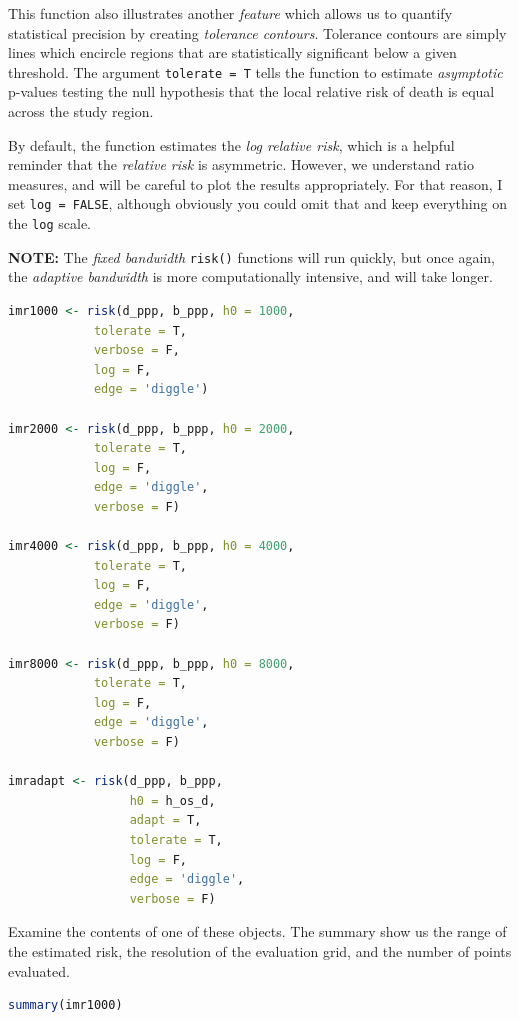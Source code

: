\documentclass[
]{book}
\newcommand{\passthrough}[1]{#1}
\begin{document}
This function also illustrates another \emph{feature} which allows us to quantify statistical precision by creating \emph{tolerance contours}. Tolerance contours are simply lines which encircle regions that are statistically significant below a given threshold. The argument \passthrough{\lstinline!tolerate = T!} tells the function to estimate \emph{asymptotic} p-values testing the null hypothesis that the local relative risk of death is equal across the study region.

By default, the function estimates the \emph{log relative risk}, which is a helpful reminder that the \emph{relative risk} is asymmetric. However, we understand ratio measures, and will be careful to plot the results appropriately. For that reason, I set \passthrough{\lstinline!log = FALSE!}, although obviously you could omit that and keep everything on the \passthrough{\lstinline!log!} scale.

\textbf{NOTE:} The \emph{fixed bandwidth} \passthrough{\lstinline!risk()!} functions will run quickly, but once again, the \emph{adaptive bandwidth} is more computationally intensive, and will take longer.

\begin{lstlisting}[language=R]
imr1000 <- risk(d_ppp, b_ppp, h0 = 1000, 
            tolerate = T,
            verbose = F, 
            log = F,
            edge = 'diggle')

imr2000 <- risk(d_ppp, b_ppp, h0 = 2000, 
            tolerate = T,
            log = F,
            edge = 'diggle',
            verbose = F)

imr4000 <- risk(d_ppp, b_ppp, h0 = 4000, 
            tolerate = T,
            log = F,
            edge = 'diggle',
            verbose = F)

imr8000 <- risk(d_ppp, b_ppp, h0 = 8000, 
            tolerate = T,
            log = F,
            edge = 'diggle',
            verbose = F)

imradapt <- risk(d_ppp, b_ppp, 
                 h0 = h_os_d, 
                 adapt = T, 
                 tolerate = T,
                 log = F,
                 edge = 'diggle',
                 verbose = F)
\end{lstlisting}

Examine the contents of one of these objects. The summary show us the range of the estimated risk, the resolution of the evaluation grid, and the number of points evaluated.

\begin{lstlisting}[language=R]
summary(imr1000)
\end{lstlisting}
\end{document}
